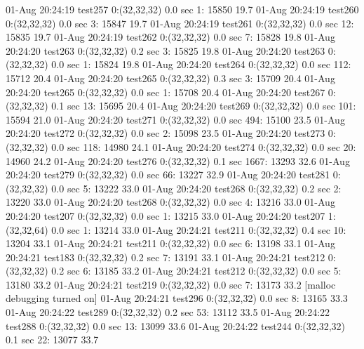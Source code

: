 01-Aug 20:24:19 test257     0:(32,32,32)     0.0 sec    1: 15850 19.7%
01-Aug 20:24:19 test260     0:(32,32,32)     0.0 sec    3: 15847 19.7%
01-Aug 20:24:19 test261     0:(32,32,32)     0.0 sec   12: 15835 19.7%
01-Aug 20:24:19 test262     0:(32,32,32)     0.0 sec    7: 15828 19.8%
01-Aug 20:24:20 test263     0:(32,32,32)     0.2 sec    3: 15825 19.8%
01-Aug 20:24:20 test263     0:(32,32,32)     0.0 sec    1: 15824 19.8%
01-Aug 20:24:20 test264     0:(32,32,32)     0.0 sec  112: 15712 20.4%
01-Aug 20:24:20 test265     0:(32,32,32)     0.3 sec    3: 15709 20.4%
01-Aug 20:24:20 test265     0:(32,32,32)     0.0 sec    1: 15708 20.4%
01-Aug 20:24:20 test267     0:(32,32,32)     0.1 sec   13: 15695 20.4%
01-Aug 20:24:20 test269     0:(32,32,32)     0.0 sec  101: 15594 21.0%
01-Aug 20:24:20 test271     0:(32,32,32)     0.0 sec  494: 15100 23.5%
01-Aug 20:24:20 test272     0:(32,32,32)     0.0 sec    2: 15098 23.5%
01-Aug 20:24:20 test273     0:(32,32,32)     0.0 sec  118: 14980 24.1%
01-Aug 20:24:20 test274     0:(32,32,32)     0.0 sec   20: 14960 24.2%
01-Aug 20:24:20 test276     0:(32,32,32)     0.1 sec 1667: 13293 32.6%
01-Aug 20:24:20 test279     0:(32,32,32)     0.0 sec   66: 13227 32.9%
01-Aug 20:24:20 test281     0:(32,32,32)     0.0 sec    5: 13222 33.0%
01-Aug 20:24:20 test268     0:(32,32,32)     0.2 sec    2: 13220 33.0%
01-Aug 20:24:20 test268     0:(32,32,32)     0.0 sec    4: 13216 33.0%
01-Aug 20:24:20 test207     0:(32,32,32)     0.0 sec    1: 13215 33.0%
01-Aug 20:24:20 test207     1:(32,32,64)     0.0 sec    1: 13214 33.0%
01-Aug 20:24:21 test211     0:(32,32,32)     0.4 sec   10: 13204 33.1%
01-Aug 20:24:21 test211     0:(32,32,32)     0.0 sec    6: 13198 33.1%
01-Aug 20:24:21 test183     0:(32,32,32)     0.2 sec    7: 13191 33.1%
01-Aug 20:24:21 test212     0:(32,32,32)     0.2 sec    6: 13185 33.2%
01-Aug 20:24:21 test212     0:(32,32,32)     0.0 sec    5: 13180 33.2%
01-Aug 20:24:21 test219     0:(32,32,32)     0.0 sec    7: 13173 33.2%
[malloc debugging turned on]
01-Aug 20:24:21 test296     0:(32,32,32)     0.0 sec    8: 13165 33.3%
01-Aug 20:24:22 test289     0:(32,32,32)     0.2 sec   53: 13112 33.5%
01-Aug 20:24:22 test288     0:(32,32,32)     0.0 sec   13: 13099 33.6%
01-Aug 20:24:22 test244     0:(32,32,32)     0.1 sec   22: 13077 33.7%
